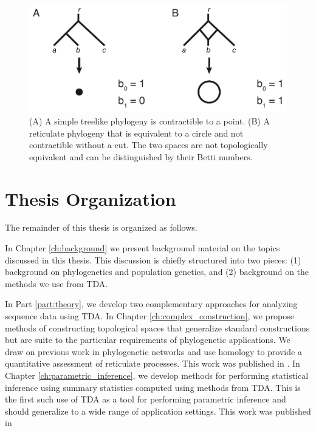 \begin{figure}
\centering
\includegraphics[width=.8\columnwidth]{./fig/introduction/simple_tree_example.pdf}
\caption[Treelike and reticulate phylogenies]{(A) A simple treelike phylogeny is contractible to a point. (B) A reticulate phylogeny that is equivalent to a circle and not contractible without a cut. The two spaces are not topologically equivalent and can be distinguished by their Betti numbers.}
\label{intro:fig:simple_tree_example}
\end{figure}


\section{Thesis Organization}

The remainder of this thesis is organized as follows.

In Chapter \ref{ch:background} we present background material on the topics discussed in this thesis.
This discussion is chiefly structured into two pieces: (1) background on phylogenetics and population genetics, and (2) background on the methods we use from TDA.

In Part \ref{part:theory}, we develop two complementary approaches for analyzing sequence data using TDA.
In Chapter \ref{ch:complex_construction}, we propose methods of constructing topological spaces that generalize standard constructions but are suite to the particular requirements of phylogenetic applications.
We draw on previous work in phylogenetic networks and use homology to provide a quantitative assessment of reticulate processes.
This work was published in \cite{Emmett:2015a}.
In Chapter \ref{ch:parametric_inference}, we develop methods for performing statistical inference using summary statistics computed using methods from TDA.
This is the first such use of TDA as a tool for performing parametric inference and should generalize to a wide range of application settings.
This work was published in \cite{Emmett:2014b}

